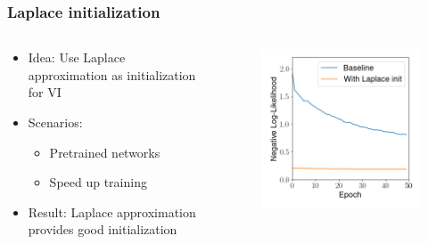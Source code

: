 \documentclass{beamer}
\begin{document}
        \begin{frame}
            \frametitle{Laplace initialization}
            \begin{columns}
                \begin{column}{0.5\textwidth}
                    \begin{itemize}
                        \item Idea: Use Laplace approximation as initialization for VI
                        \item Scenarios:
                            \begin{itemize}
                                \item Pretrained networks
                                \item Speed up training
                            \end{itemize}
                        \item Result: Laplace approximation provides good initialization 
                    \end{itemize}    
                \end{column}
                \begin{column}{0.5\textwidth}                    
                    \begin{figure}
                        \includegraphics[width=\textwidth]{images/Classification/LaplaceInit.png}
                    \end{figure}
                \end{column}
            \end{columns}
        \end{frame}
\end{document}
